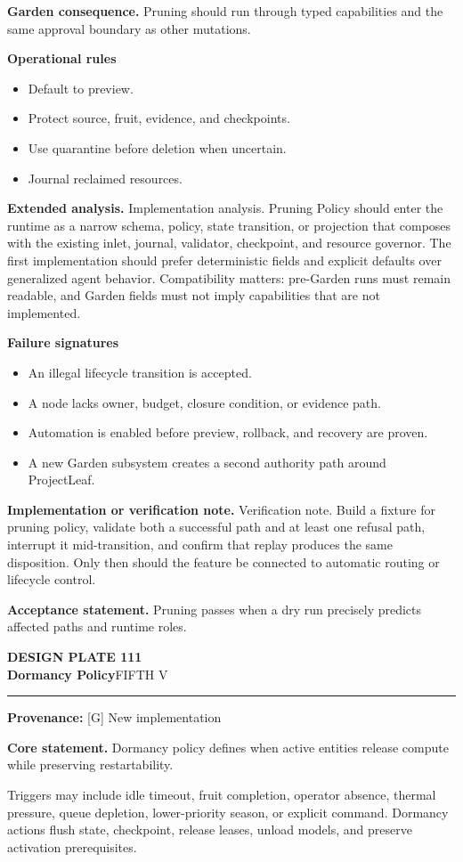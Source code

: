 \documentclass[10pt,letterpaper,oneside]{article}
\newcommand{\prov}[1]{\textcolor{gardenBlue}{\sffamily\footnotesize\textbf{Provenance:} #1}}
\newcommand{\platetitle}[3]{%
  \begin{minipage}[t][0.54in][t]{\textwidth}
  {\sffamily\bfseries\color{gardenDeep}\fontsize{9}{10}\selectfont DESIGN PLATE #1}\\[-1pt]
  {\sffamily\bfseries\color{gardenInk}\fontsize{16.5}{18}\selectfont #2}\hfill{\sffamily\color{gardenGreen}\large #3}
  \end{minipage}\vspace{-2pt}\hrule\vspace{5pt}}
\begin{document}
\textbf{Garden consequence.} Pruning should run through typed capabilities and the same approval boundary as other mutations.

\textbf{Operational rules}
\begin{itemize}
\item Default to preview.
\item Protect source, fruit, evidence, and checkpoints.
\item Use quarantine before deletion when uncertain.
\item Journal reclaimed resources.
\end{itemize}
\textbf{Extended analysis.} Implementation analysis. Pruning Policy should enter the runtime as a narrow schema, policy, state transition, or projection that composes with the existing inlet, journal, validator, checkpoint, and resource governor. The first implementation should prefer deterministic fields and explicit defaults over generalized agent behavior. Compatibility matters: pre-Garden runs must remain readable, and Garden fields must not imply capabilities that are not implemented.

\textbf{Failure signatures}
\begin{itemize}
\item An illegal lifecycle transition is accepted.
\item A node lacks owner, budget, closure condition, or evidence path.
\item Automation is enabled before preview, rollback, and recovery are proven.
\item A new Garden subsystem creates a second authority path around ProjectLeaf.
\end{itemize}
\textbf{Implementation or verification note.} Verification note. Build a fixture for pruning policy, validate both a successful path and at least one refusal path, interrupt it mid-transition, and confirm that replay produces the same disposition. Only then should the feature be connected to automatic routing or lifecycle control.

\begin{acceptbox}
\textbf{Acceptance statement.} Pruning passes when a dry run precisely predicts affected paths and runtime roles.
\end{acceptbox}
\newpage
\platetitle{111}{Dormancy Policy}{FIFTH V}
\prov{[G] New implementation}
\fontsize{8.85}{10.45}\selectfont
\begin{corebox}
\textbf{Core statement.} Dormancy policy defines when active entities release compute while preserving restartability.
\end{corebox}
Triggers may include idle timeout, fruit completion, operator absence, thermal pressure, queue depletion, lower-priority season, or explicit command. Dormancy actions flush state, checkpoint, release leases, unload models, and preserve activation prerequisites.
\end{document}
